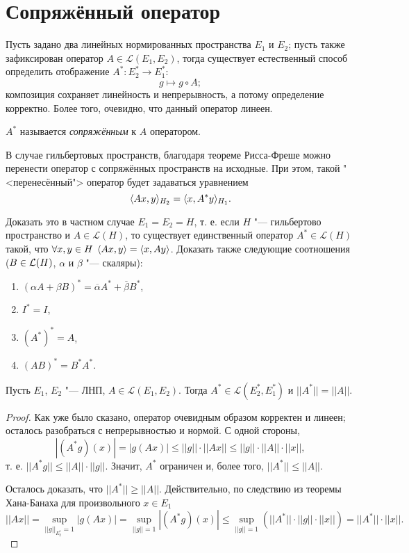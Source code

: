 \documentclass[main]{subfiles}
\begin{document}
\section{Сопряжённый оператор} %

Пусть задано два линейных нормированных пространства
\( E_1 \) и $E_2$;
пусть также зафиксирован оператор $A \in \mathcal{L}(E_1, E_2)$,
тогда существует естественный способ определить
отображение $A^* : E_2^* \to E_1^*$:
\[
  g \mapsto g \circ A;
\]
композиция сохраняет линейность
и непрерывность, а потому определение корректно.
Более того, очевидно, что данный оператор линеен.

\begin{definition}
  \( A^* \) называется \emph{сопряжённым} к \( A \) оператором.
\end{definition}

В случае гильбертовых пространств, благодаря теореме
Рисса-Фреше можно перенести оператор с сопряжённых пространств
на исходные. При этом, такой "<перенесённый"> оператор
будет задаваться уравнением
\[
  \langle A x, y \rangle_{H_2} = \langle x, A^* y \rangle_{H_1}.
\]

\begin{exercise}
  Доказать это в частном случае \( E_1 = E_2 = H \),
  т. е. если \(H \) "--- гильбертово пространство и
  \( A \in \mathcal{L}(H) \), то
  существует единственный оператор
  \( A^* \in \mathcal{L}(H) \) такой,
  что
  \( \forall {x, y \in H} \; \, \langle Ax, y \rangle = \langle x, Ay \rangle \).
  Доказать также следующие соотношения
  (\( B \in \Linears{H} \),
  \( \alpha \) и \( \beta \) "--- скаляры):
  \begin{enumerate}
    \item $(\alpha A + \beta B)^* = \overline{\alpha} A^* + \overline{\beta} B^*$,
    \item $I^* = I$,
    \item $(A^*)^* = A$,
    \item $(AB)^* = B^* A^*$.
  \end{enumerate}
\end{exercise}

\begin{theorem}%
  Пусть $E_1$, $E_2$ "--- ЛНП,
  $A \in \mathcal{L}(E_1, E_2)$.
  Тогда $A^* \in \mathcal{L}(E_2^*, E_1^*)$
  и $||A^*|| = ||A||$.
\end{theorem}
\begin{proof}
  Как уже было сказано, оператор очевидным образом
  корректен и линеен; осталось разобраться
  с непрерывностью и нормой.
  С одной стороны,
  \[
    |(A^* g)(x)| = |g(Ax)| \le
    ||g|| \cdot ||Ax|| \le ||g|| \cdot ||A|| \cdot ||x||,
  \]
  т. е. $||A^* g|| \le ||A|| \cdot ||g||$.
  Значит, $A^*$ ограничен и, более того,
  $||A^*|| \le ||A||$.

  Осталось доказать, что $||A^*|| \ge ||A||$.
  Действительно, по следствию из теоремы Хана-Банаха для произвольного $x \in E_1$
  \[
    ||A x|| = \sup_{||g||_{E_2^*} = 1} |g(Ax)| =
    \sup_{||g|| = 1} |(A^* g)(x)| \le
    \sup_{||g|| = 1} \left(||A^*|| \cdot ||g|| \cdot ||x||\right) =
    ||A^*|| \cdot ||x||.
  \]
\end{proof}
\end{document}
